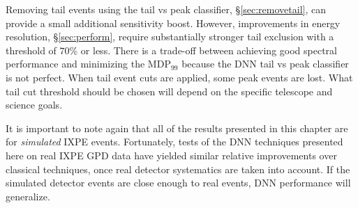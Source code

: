 Removing tail events using the tail vs peak classifier, \S\ref{sec:removetail}, can provide a small additional sensitivity boost. However, improvements in energy resolution, \S\ref{sec:perform}, require substantially stronger tail exclusion with a threshold of $70\%$ or less. There is a trade-off between achieving good spectral performance and minimizing the MDP$_{99}$ because the DNN tail vs peak classifier is not perfect. When tail event cuts are applied, some peak events are lost. What tail cut threshold should be chosen will depend on the specific telescope and science goals.

It is important to note again that all of the results presented in this chapter are for \textit{simulated} IXPE events. Fortunately, tests of the DNN techniques presented here on real IXPE GPD data have yielded similar relative improvements over classical techniques, once real detector systematics are taken into account. If the simulated detector events are close enough to real events, DNN performance will generalize.